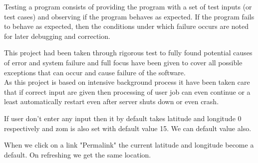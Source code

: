 Testing a program consists of providing the program with a set of test inputs (or test cases) and
observing if the program behaves as expected. If the program fails to behave as expected, then the
conditions under which failure occurs are noted for later debugging and correction.


This project had been taken through rigorous test to fully found potential causes of error and system failure
and full focus have been given to cover all possible exceptions that can
occur and cause failure of the software.\\
As this project is based on intensive background process it have been taken care that if correct input are given then processing of user job can even continue or a least automatically restart even after server shuts down or even crash.

If user don't enter any input then it by default takes latitude and longitude 0 respectively and zom is also set with default value 15. We can default value also.

When we click on a link "Permalink" the current latitude and longitude become a default. On refreshing we get the same location.


